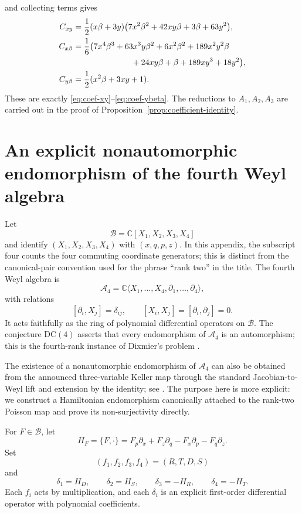 \documentclass[11pt]{article}
\newcommand{\C}{\mathbb C}
\newcommand{\Bcal}{\mathcal B}
\newcommand{\Weyl}{\mathcal A}
\newcommand{\DC}{\mathrm{DC}}
\theoremstyle{remark}
\begin{document}
and collecting terms gives
\begin{align*}
  C_{xy}
  &=\frac12(x\beta+3y)
      \bigl(7x^2\beta^2+42xy\beta+3\beta+63y^2\bigr),\\
  C_{x\beta}
  &=\frac16\bigl(7x^4\beta^3+63x^3y\beta^2+6x^2\beta^2
      +189x^2y^2\beta\\
  &\hspace{25mm}{}+24xy\beta+\beta+189xy^3+18y^2\bigr),\\
  C_{y\beta}
  &=\frac12(x^2\beta+3xy+1).
\end{align*}
These are exactly \eqref{eq:coef-xy}--\eqref{eq:coef-ybeta}.  The reductions
to \(A_1,A_2,A_3\) are carried out in the proof of
Proposition~\ref{prop:coefficient-identity}.

\section{An explicit nonautomorphic endomorphism of the fourth Weyl algebra}
\label{app:DC4}

Let
\[
  \Bcal=\C[X_1,X_2,X_3,X_4]
\]
and identify \((X_1,X_2,X_3,X_4)\) with \((x,q,p,z)\).  In this appendix,
the subscript four counts the four commuting coordinate generators; this is
distinct from the canonical-pair convention used for the phrase ``rank two''
in the title.  The fourth Weyl algebra is
\[
  \Weyl_4
  =\C\langle X_1,\dots,X_4,\partial_1,\dots,\partial_4\rangle,
\]
with relations
\[
  [\partial_i,X_j]=\delta_{ij},
  \qquad
  [X_i,X_j]=[\partial_i,\partial_j]=0.
\]
It acts faithfully as the ring of polynomial differential operators on
\(\Bcal\).  The conjecture \(\DC(4)\) asserts that every endomorphism of
\(\Weyl_4\) is an automorphism; this is the fourth-rank instance of Dixmier's
problem \cite{Dixmier}.

The existence of a nonautomorphic endomorphism of \(\Weyl_4\) can also be
obtained from the announced three-variable Keller map through the standard
Jacobian-to-Weyl lift and extension by the identity; see
\cite[equations~(1)--(2) and Proposition~5(3)]{Bavula}.  The purpose here is
more explicit: we construct a Hamiltonian endomorphism canonically attached to
the rank-two Poisson map and prove its non-surjectivity directly.

For \(F\in\Bcal\), let
\begin{equation}\label{eq:Hamiltonian-derivation}
  H_F=\{F,\mathord\cdot\}
  =F_p\partial_x+F_z\partial_q-F_x\partial_p-F_q\partial_z.
\end{equation}
Set
\begin{equation}\label{eq:f-vector-DC4}
  (f_1,f_2,f_3,f_4)=(R,T,D,S)
\end{equation}
and
\begin{equation}\label{eq:delta-vector-DC4}
  \delta_1=H_D,
  \qquad
  \delta_2=H_S,
  \qquad
  \delta_3=-H_R,
  \qquad
  \delta_4=-H_T.
\end{equation}
Each \(f_i\) acts by multiplication, and each \(\delta_i\) is an explicit
first-order differential operator with polynomial coefficients.
\end{document}
